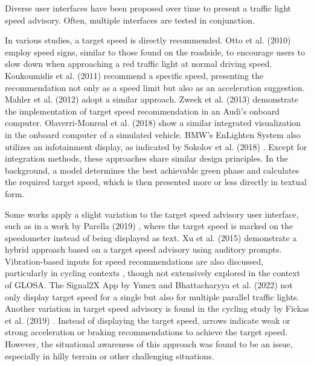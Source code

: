 Diverse user interfaces have been proposed over time to present a traffic light speed advisory. Often, multiple interfaces are tested in conjunction.

In various studies, a target speed is directly recommended. Otto et al. (2010) \cite{otto_operating_2010} employ speed signs, similar to those found on the roadside, to encourage users to slow down when approaching a red traffic light at normal driving speed. Koukoumidis et al. (2011) \cite{koukoumidis_signalguru_2011, koukoumidis_leveraging_2012} recommend a specific speed, presenting the recommendation not only as a speed limit but also as an acceleration suggestion. Mahler et al. (2012) \cite{mahler_reducing_2012} adopt a similar approach. Zweck et al. (2013) \cite{zweck_traffic_2013} demonstrate the implementation of target speed recommendation in an Audi's onboard computer. Olaverri-Monreal et al. (2018) \cite{olaverri-monreal_implementation_2018} show a similar integrated visualization in the onboard computer of a simulated vehicle. BMW's EnLighten System also utilizes an infotainment display, as indicated by Sokolov et al. (2018) \cite{sokolov_effects_2018}. Except for integration methods, these approaches share similar design principles. In the background, a model determines the best achievable green phase and calculates the required target speed, which is then presented more or less directly in textual form.

Some works apply a slight variation to the target speed advisory user interface, such as in a work by Parella (2019) \cite{marias_parella_design_2019}, where the target speed is marked on the speedometer instead of being displayed as text. Xu et al. (2015) \cite{xu_bb_2015} demonstrate a hybrid approach based on a target speed advisory using auditory prompts. Vibration-based inputs for speed recommendations are also discussed, particularly in cycling contexts \cite{cespedes_group_2019}, though not extensively explored in the context of GLOSA. The Signal2X App by Yunex \cite{yunex_traffic_v2x-kommunikation_2023} and Bhattacharyya et al. (2022) \cite{bhattacharyya_assessing_2022} not only display target speed for a single but also for multiple parallel traffic lights. Another variation in target speed advisory is found in the cycling study by Fickas et al. (2019) \cite{fickas_fast_2019}. Instead of displaying the target speed, arrows indicate weak or strong acceleration or braking recommendations to achieve the target speed. However, the situational awareness of this approach was found to be an issue, especially in hilly terrain or other challenging situations.

